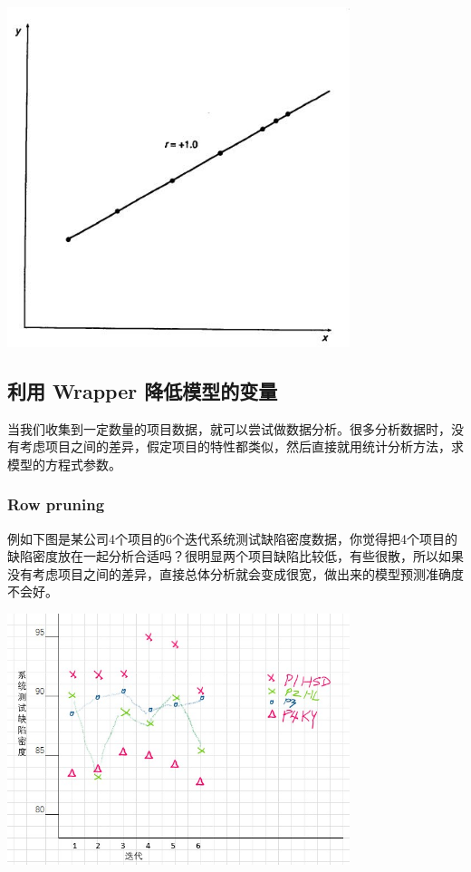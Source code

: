 \includegraphics[width=10cm]{maxwell_f68.jpg}

\hypertarget{ux5229ux7528-wrapper-ux964dux4f4eux6a21ux578bux7684ux53d8ux91cf}{%
\subsection{利用 Wrapper
降低模型的变量}\label{ux5229ux7528-wrapper-ux964dux4f4eux6a21ux578bux7684ux53d8ux91cf}}

当我们收集到一定数量的项目数据，就可以尝试做数据分析。很多分析数据时，没有考虑项目之间的差异，假定项目的特性都类似，然后直接就用统计分析方法，求模型的方程式参数。\\

\hypertarget{row-pruning}{%
\subsubsection{Row pruning}\label{row-pruning}}

例如下图是某公司4个项目的6个迭代系统测试缺陷密度数据，你觉得把4个项目的缺陷密度放在一起分析合适吗？很明显两个项目缺陷比较低，有些很散，所以如果没有考虑项目之间的差异，直接总体分析就会变成很宽，做出来的模型预测准确度不会好。


\includegraphics[width=10cm]{M4BrowPruningGraphScreenshot_2023-01-04_203004.jpg}

